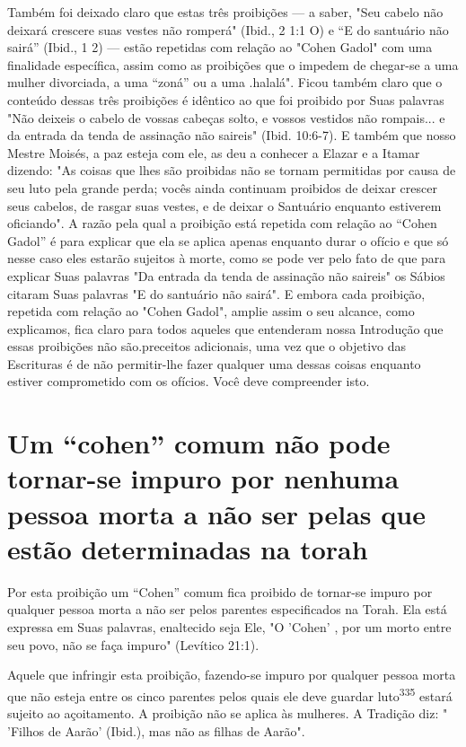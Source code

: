 Também foi deixado claro que estas três proibições --- a saber, "Seu
cabelo não deixará crescere suas vestes não romperá" (Ibid., 2 1:1 O) e
``E do santuário não sairá'' (Ibid., 1 2) --- estão repetidas com relação
ao "Cohen Ga­dol" com uma finalidade específica, assim como as
proibições que o impedem de chegar-se a uma mulher divorciada, a uma
``zoná'' ou a uma .halalá". Ficou também claro que o
conteúdo dessas três proibições é idêntico ao que foi proi­bido por Suas
palavras "Não deixeis o cabelo de vossas cabeças solto, e vossos
vestidos não rompais... e da entrada da tenda de assinação não saireis"
(Ibid. 10:6-7). E também que nosso Mestre Moisés, a paz esteja com ele,
as deu a co­nhecer a Elazar e a Itamar dizendo: "As coisas que lhes são
proibidas não se tornam permitidas por causa de seu luto pela grande
perda; vocês ainda conti­nuam proibidos de deixar crescer seus cabelos,
de rasgar suas vestes, e de dei­xar o Santuário enquanto estiverem
oficiando". A razão pela qual a proibição está repetida com relação ao
``Cohen Gadol'' é para explicar que ela se aplica apenas enquanto durar o
ofício e que só nesse caso eles estarão sujeitos à mor­te, como se pode
ver pelo fato de que para explicar Suas palavras "Da entrada da tenda de
assinação não saireis" os Sábios citaram Suas palavras "E do san­tuário
não sairá". E embora cada proibição, repetida com relação ao "Cohen
Gadol", amplie assim o seu alcance, como explicamos, fica claro para
todos aqueles que entenderam nossa Introdução que essas proibições não
são.precei­tos adicionais, uma vez que o objetivo das
Escrituras é de não permitir-lhe fa­zer qualquer uma dessas coisas
enquanto estiver comprometido com os ofícios. Você deve compreender
isto.

\section{Um ``cohen'' comum não pode tornar-se impuro por nenhuma pessoa morta
a não ser pelas que estão determinadas na torah}

Por esta proibição um ``Cohen'' comum fica proibido de tornar-se impuro
por qualquer pessoa morta a não ser pelos parentes especificados na
Torah. Ela está expressa em Suas palavras, enaltecido seja Ele, "O
'Cohen' , por um morto entre seu povo, não se faça impuro" (Levítico
21:1).

Aquele que infringir esta proibição, fazendo-se impuro por qualquer
pessoa morta que não esteja entre os cinco parentes pelos quais ele deve
guar­dar luto\textsuperscript{335} estará sujeito ao açoitamento. A
proibição não se aplica às mulhe­res. A Tradição diz: " 'Filhos de
Aarão' (Ibid.), mas não as filhas de Aarão".

